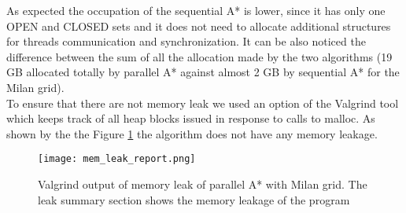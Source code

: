 As expected the occupation of the sequential A* is lower, since it has only one OPEN and CLOSED sets and it does not need to allocate additional structures for threads communication and synchronization.
It can be also noticed the difference between the sum of all the allocation made by the two algorithms (19 GB allocated totally by parallel A* against almost 2 GB by sequential A* for the Milan grid).
\\
To ensure that there are not memory leak we used an option of the Valgrind tool which keeps track of all heap blocks issued in response to calls to malloc.
As shown by the the Figure \ref{mem-leak-milan} the algorithm does not have any memory leakage.

\begin{figure}[h]
    \centering
    \texttt{[image: mem\_leak\_report.png]}
    \caption{Valgrind output of memory leak of parallel A* with Milan grid. The leak summary section shows the memory leakage of the program}
    \label{mem-leak-milan}
\end{figure}


